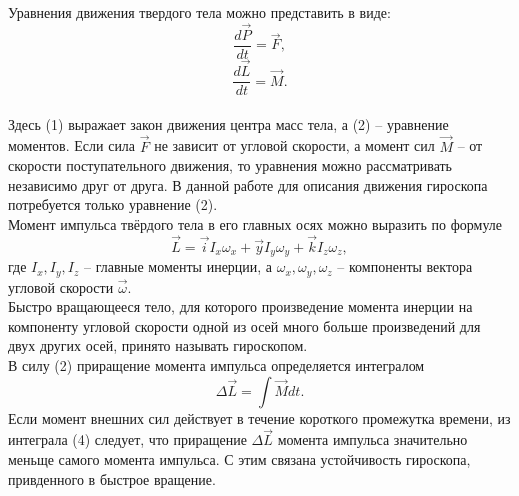 \documentclass[a4paper]{article}
\begin{document}
Уравнения движения твердого тела можно представить в виде:
\begin{equation}
\frac{d\vec{P}}{dt} = \vec{F},
\end{equation}
\begin{equation}
\frac{d\vec{L}}{dt} = \vec{M}.
\end{equation} \\
Здесь (1) выражает закон движения центра масс тела, а (2) – уравнение моментов. Если сила $\vec{F}$ не зависит от угловой скорости, а момент сил $\vec{M}$ -- от скорости поступательного движения, то уравнения можно рассматривать независимо друг от друга. В данной работе для описания движения гироскопа потребуется только уравнение (2). \vspace{0.25 cm} \\
Момент импульса твёрдого тела в его главных осях можно выразить по формуле
\begin{equation}
\vec{L} = \vec{i}I_x\omega_x + \vec{y}I_y\omega_y + \vec{k}I_z\omega_z,
\end{equation} 
где $I_x, I_y, I_z$ – главные моменты инерции, а $\omega_x, \omega_y, \omega_z$ – компоненты вектора угловой скорости $\vec{\omega}$. \vspace{0.25 cm} \\ 
Быстро вращающееся тело, для которого произведение момента инерции на компоненту угловой скорости одной из осей много больше произведений для двух других осей, принято называть гироскопом.  \vspace{0.25 cm} \\
В силу (2) приращение момента импульса определяется интегралом
\begin{equation} 
\Delta \vec{L} = \int\vec{M} dt.
\end{equation}
Если момент внешних сил действует в течение короткого промежутка времени, из интеграла (4) следует, что приращение $\Delta\vec{L}$ момента импульса значительно меньще самого момента импульса. С этим связана устойчивость гироскопа, привденного в быстрое вращение. \vspace{0.25 cm}
\end{document}

